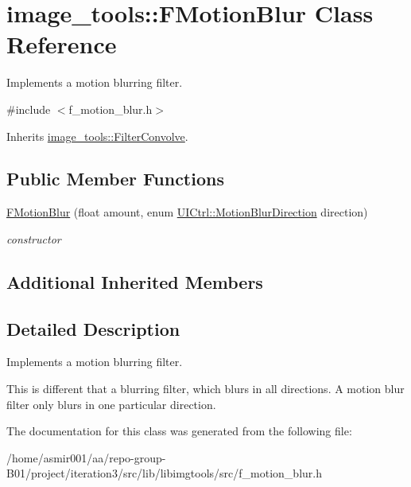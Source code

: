 \hypertarget{classimage__tools_1_1FMotionBlur}{}\section{image\+\_\+tools\+:\+:F\+Motion\+Blur Class Reference}
\label{classimage__tools_1_1FMotionBlur}


Implements a motion blurring filter.  




{\ttfamily \#include $<$f\+\_\+motion\+\_\+blur.\+h$>$}



Inherits \hyperlink{classimage__tools_1_1FilterConvolve}{image\+\_\+tools\+::\+Filter\+Convolve}.

\subsection*{Public Member Functions}
\begin{DoxyCompactItemize}
\item 
\hyperlink{classimage__tools_1_1FMotionBlur_a1cb472dcd0a7d2a26fb81fbeeccb78c1}{F\+Motion\+Blur} (float amount, enum \hyperlink{classimage__tools_1_1UICtrl_a56d4f68bf91302769d7bc453d8d57cee}{U\+I\+Ctrl\+::\+Motion\+Blur\+Direction} direction)\hypertarget{classimage__tools_1_1FMotionBlur_a1cb472dcd0a7d2a26fb81fbeeccb78c1}{}\label{classimage__tools_1_1FMotionBlur_a1cb472dcd0a7d2a26fb81fbeeccb78c1}

\begin{DoxyCompactList}\small\item\em constructor \end{DoxyCompactList}\end{DoxyCompactItemize}
\subsection*{Additional Inherited Members}


\subsection{Detailed Description}
Implements a motion blurring filter. 

This is different that a blurring filter, which blurs in all directions. A motion blur filter only blurs in one particular direction. 

The documentation for this class was generated from the following file\+:\begin{DoxyCompactItemize}
\item 
/home/asmir001/aa/repo-\/group-\/\+B01/project/iteration3/src/lib/libimgtools/src/f\+\_\+motion\+\_\+blur.\+h\end{DoxyCompactItemize}
